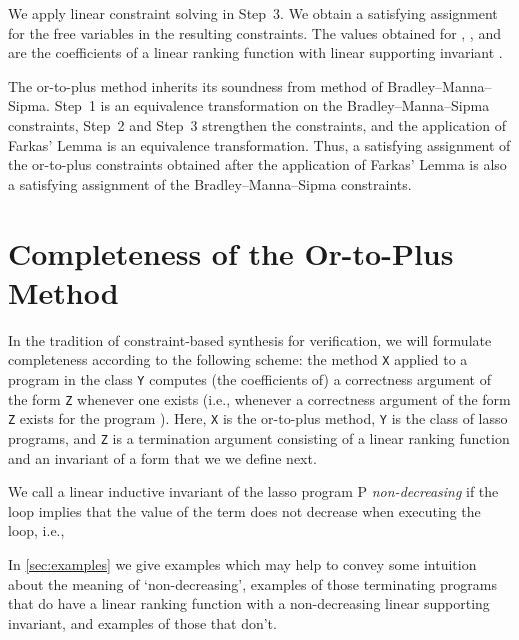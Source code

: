 \documentclass[a4paper]{llncs}
\begin{document}
We apply linear constraint solving in Step~3. We obtain a satisfying assignment for the free variables in the resulting constraints.
The values obtained for , ,  and   are the coefficients of a linear ranking function  with linear supporting invariant .



The or-to-plus method inherits its soundness from method of Bradley--Manna--Sipma. 
Step~1 is an equivalence
transformation on the Bradley--Manna--Sipma constraints, Step~2 and
Step~3 strengthen the constraints, and the application of Farkas' Lemma
is an equivalence transformation.   Thus, a satisfying assignment of the
or-to-plus constraints obtained after the application of Farkas' Lemma is also a satisfying assignment of the Bradley--Manna--Sipma constraints.









\section{Completeness of the Or-to-Plus Method}

In the tradition of constraint-based synthesis for verification, we
will formulate completeness according to the following scheme: the method
\texttt{X} applied to a program  in the class \texttt{Y} computes (the
coefficients of) a correctness argument of the form \texttt{Z}
whenever one exists (i.e., whenever a correctness argument of the form
\texttt{Z} exists for the program ).  Here, \texttt{X} is the
or-to-plus method, \texttt{Y} is the class of lasso programs, and
\texttt{Z} is a termination argument consisting of a linear ranking
function and an invariant of a form that we we define next.

\begin{definition}
We call a linear inductive invariant  of the lasso program P \emph{non-decreasing} if the loop implies that the value of the term  does not decrease when executing the loop, i.e.,

\end{definition}

In \autoref{sec:examples} we give examples which may help to convey some
intuition about the meaning of `non-decreasing', examples of those
terminating programs that do have a linear ranking function with a
non-decreasing linear supporting invariant, and examples of those that
don't.  
\end{document}
